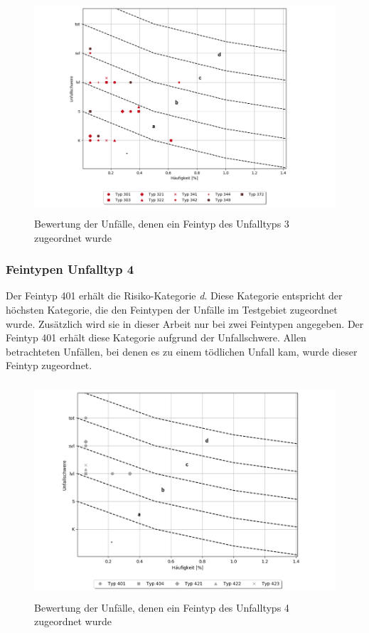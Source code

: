 \begin{savenotes}
	\begin{figure}[H]
		\centering
		\includegraphics[width=12cm,height=8cm]{figures/Bewertung_FT3}
		\caption[Bewertung der Unfälle, denen ein Feintyp des Unfalltyps 3 zugeordnet wurde]{Bewertung der Unfälle, denen ein Feintyp des Unfalltyps 3 zugeordnet wurde}\label{fig:Bewertung_FT3}
	\end{figure}
\end{savenotes}

\subsubsection{Feintypen Unfalltyp 4}
Der Feintyp 401 erhält die Risiko-Kategorie \textit{d}. Diese Kategorie entspricht der höchsten Kategorie, die den Feintypen der Unfälle im Testgebiet zugeordnet wurde. Zusätzlich wird sie in dieser Arbeit nur bei zwei Feintypen angegeben. Der Feintyp 401 erhält diese Kategorie aufgrund der Unfallschwere. Allen betrachteten Unfällen, bei denen es zu einem tödlichen Unfall kam, wurde dieser Feintyp zugeordnet.

\begin{savenotes}
	\begin{figure}[H]
		\centering
		\includegraphics[width=12cm,height=8cm]{figures/Bewertung_FT4}
		\caption[Bewertung der Unfälle, denen ein Feintyp des Unfalltyps 4 zugeordnet wurde]{Bewertung der Unfälle, denen ein Feintyp des Unfalltyps 4 zugeordnet wurde}\label{fig:Bewertung_FT4}
	\end{figure}
\end{savenotes}

